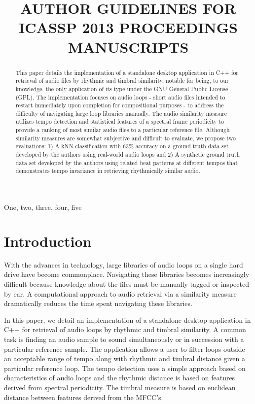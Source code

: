 \documentclass{article}
\title{AUTHOR GUIDELINES FOR ICASSP 2013 PROCEEDINGS MANUSCRIPTS}
\begin{document}
%
\maketitle
%
\begin{abstract}
This paper details the implementation of a standalone desktop application in C++ for retrieval of audio files by rhythmic and timbral similarity, notable for being, to our knowledge, the only application of its type under the GNU General Public License (GPL). The implementation focuses on audio loops - short audio files intended to restart immediately upon completion for compositional purposes - to address the difficulty of navigating large loop libraries manually. The audio similarity measure utilizes tempo detection and statistical features of a spectral frame periodicity to provide a ranking of most similar audio files to a particular reference file. Although similarity measures are somewhat subjective and difficult to evaluate, we propose two evaluations: 1) A kNN classification with 63\% accuracy on a ground truth data set developed by the authors using real-world audio loops and 2) A synthetic ground truth data set developed by the authors using related beat patterns at different tempos that demonstrates tempo invariance in retrieving rhythmically similar audio. \cite{audiocompare}
\end{abstract}
%
\begin{keywords}
One, two, three, four, five
\end{keywords}
%
\section{Introduction}

With the advances in technology, large libraries of audio loops on a single hard drive have become commonplace. Navigating these libraries becomes increasingly difficult because knowledge about the files must be manually tagged or inspected by ear. A computational approach to audio retrieval via a similarity measure dramatically reduces the time spent navigating these libraries.

In this paper, we detail an implementation of a standalone desktop application in C++ for retrieval of audio loops by rhythmic and timbral similarity. A common task is finding an audio sample to sound simultaneously or in succession with a particular reference sample. The application allows a user to filter loops outside an acceptable range of tempo along with rhythmic and timbral distance given a particular reference loop. The tempo detection uses a simple approach based on characteristics of audio loops and the rhythmic distance is based on features derived from spectral periodicity. The timbral measure is based on euclidean distance between features derived from the MFCC’s.
\end{document}
